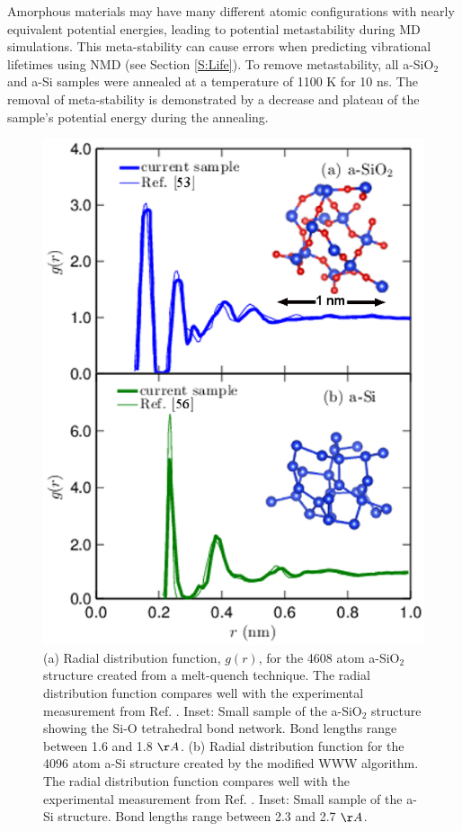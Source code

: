 \documentclass[aps,prb,onecolumn,preprint,superscriptaddress,footinbib,amsmath,amssymb,floatfix]{revtex4}
\begin{document}
Amorphous materials may have many different atomic 
configurations with nearly equivalent potential energies, 
leading to potential metastability during MD simulations.
\cite{feldman_numerical_1999,bernstein_structural_2006,he_heat_2011} 
This meta-stability can 
cause errors when predicting vibrational lifetimes using NMD 
(see Section \ref{S:Life}). 
To remove metastability, all a-SiO$_2$ and a-Si samples 
were annealed at a temperature of 
1100 K for 10 ns.\cite{feldman_numerical_1999,he_heat_2011} 
The removal of meta-stability is demonstrated 
by a decrease and plateau of the sample's potential energy 
during the annealing.  

\begin{figure}
\begin{center}
\includegraphics[scale=0.65]
{fig1.eps}
\vspace*{-5mm}
\end{center}
\caption{\label{FIG:supercell} 
(a) Radial distribution function, $g(r)$, for the 4608 atom a-SiO$_2$ 
structure created from a melt-quench technique. The radial distribution 
function compares well with the experimental measurement from 
Ref. . Inset: Small sample of the 
a-SiO$_2$ structure showing the Si-O tetrahedral 
bond network. Bond lengths range between 1.6 and 1.8 $\AA$.
(b) Radial distribution function for the 4096 atom a-Si 
structure created by the modified WWW 
algorithm. The radial distribution 
function compares well with the experimental measurement from 
Ref. . Inset: Small sample of 
the a-Si structure. Bond lengths range between 2.3 and 2.7 $\AA$. 
}
\end{figure}
\end{document}
